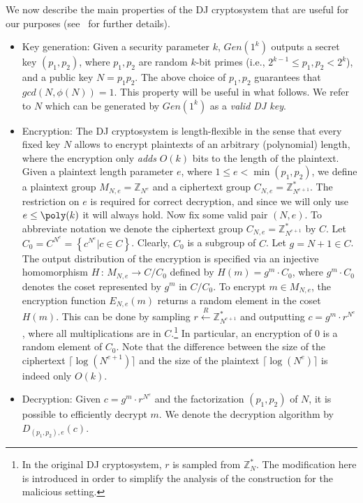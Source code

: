 \documentclass[11pt]{article}
\newcommand{\gendj}{Gen}
\newcommand{\encdj}{{E}_{N,e}}
\newcommand{\decdj}{{D}_{(p_1,p_2),e}}
\newcommand{\fnrngdom}[2]{#1\to#2}
\newcommand{\fndef}[3]{{#1\,:\,\fnrngdom{#2}{#3}}}
\newcommand{\set}[1]{\left\{#1\right\}}
\newcommand{\condset}[2]{\set{#1|#2}}
\newcommand{\Z}{{\mathbb{Z}}}
\newcommand{\usamp}[2]{#1\stackrel{R}{\leftarrow}#2}
\newcommand{\U}[1]{\mathbb{Z}_{#1}^*}
\begin{document}
We now describe the main properties of the DJ cryptosystem that are
useful for our purposes (see~\cite{DJ01} for further details).
\begin{itemize}
\item{\sc Key generation:} Given a security parameter $k$,
$\gendj(1^k)$ outputs a secret key $(p_1,p_2)$, where $p_1,p_2$ are
random $k$-bit primes (i.e., $2^{k-1}\le p_1,p_2<2^k$), and a
public key $N=p_1p_2$. The above choice of $p_1,p_2$ guarantees
that $gcd(N,\phi(N))=1$. This property will be useful in what
follows. We refer to $N$ which can be generated by $\gendj(1^k)$ as
a {\em valid DJ key}.
\item{\sc Encryption:} The DJ cryptosystem is length-flexible in the
sense that every fixed key $N$ allows to encrypt plaintexts of an
arbitrary (polynomial) length, where the encryption only {\em adds}
$O(k)$ bits to the length of the plaintext. Given a plaintext
length parameter $e$, where $1\leq e<\min{(p_1,p_2)}$, we define a
plaintext group $M_{N,e}=\Z_{N^e}$ and a ciphertext group
$C_{N,e}=\U{N^{e+1}}$.  The restriction on $e$ is required for
correct decryption, and since we will only use $e\le\poly(k)$ it
will always hold.
Now fix some valid pair $(N,e)$. To abbreviate notation we denote
the ciphertext group $C_{N,e}=\U{N^{e+1}}$ by $C$. Let
$C_0=C^{N^e}=\condset{c^{N^e}}{c\in C}$. Clearly, $C_0$ is a
subgroup of $C$. Let $g=N+1\in C$. The output distribution of the
encryption is specified via an injective homomorphism
$\fndef{H}{M_{N,e}}{C/C_0}$
defined by $H(m)=g^m\cdot C_0$, where $g^m\cdot C_0$ denotes the
coset represented by $g^m$ in $C/C_0$. To encrypt $m\in M_{N,e}$,
the encryption function $\encdj(m)$ returns a random element in the
coset $H(m)$. This can be done by sampling $\usamp{r}{\U{N^{e+1}}}$
and outputting $c=g^m\cdot{r^{N^e}}$, where all multiplications are
in $C$.\footnote{In the original DJ cryptosystem, $r$ is sampled
from $\U{N}$. The modification here is introduced in order to
simplify the analysis of the construction for the malicious
setting.} In particular, an encryption of $0$ is a random element
of $C_0$. Note that the difference between the size of the
ciphertext $\lceil\log (N^{e+1})\rceil$ and the size of the
plaintext $\lceil\log (N^e)\rceil$ is indeed only $O(k)$.

\item{\sc Decryption:} Given $c=g^m\cdot{r^{N^e}}$ and the
factorization $(p_1,p_2)$ of $N$, it is possible to efficiently
decrypt $m$. We denote the decryption algorithm by $\decdj(c)$.


\end{itemize}
\end{document}

